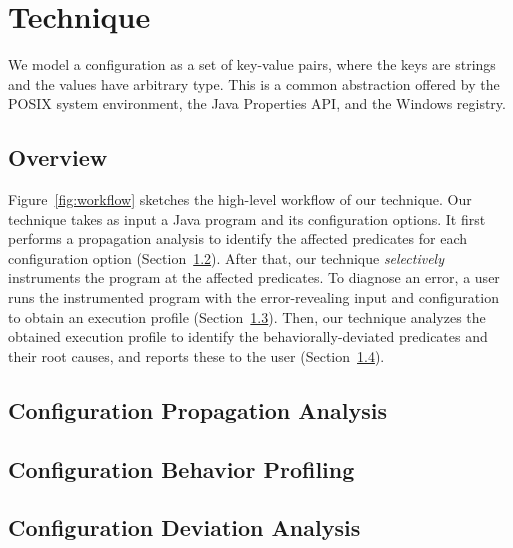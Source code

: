 \section{Technique}
\label{sec:technique}

We model a configuration as a set of key-value pairs, where
the keys are strings and the values have arbitrary type. This is
a common abstraction offered
by the POSIX system environment, the Java Properties API,
and the Windows registry.


\subsection{Overview}

Figure~\ref{fig:workflow} sketches the high-level workflow of our technique.
Our technique takes as input a Java program and its configuration options.
It first performs a propagation analysis to identify
the affected predicates for each configuration option (Section~\ref{sec:prop}).
After that, our technique \textit{selectively} instruments
the program at the affected predicates. 
To diagnose an error, a user runs the instrumented program
with the error-revealing input and configuration
to obtain an execution profile (Section~\ref{sec:profiling}).
Then, our technique analyzes the obtained execution profile
to identify the behaviorally-deviated predicates and their
root causes, and reports these to the user (Section~\ref{sec:analysis}).




\subsection{Configuration Propagation Analysis}
\label{sec:prop}


\subsection{Configuration Behavior Profiling}
\label{sec:profiling}



\subsection{Configuration Deviation Analysis}
\label{sec:analysis}



